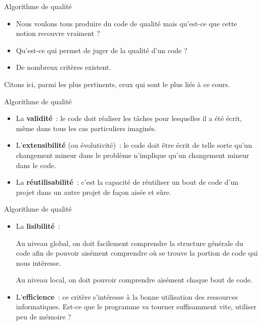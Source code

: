\begin{frame}{Algorithme de qualité}
	\begin{itemize}
	\item
	Nous voulons tous produire du code de qualité mais
	qu'est-ce que cette notion recouvre vraiment ?
	\item
	Qu'est-ce qui permet de juger de la qualité
	d'un code ? 
	\item
	De nombreux critères existent. 
	\end{itemize}
	
	\bigskip
	
	Citons ici,
	parmi les plus pertinents, ceux qui sont le plus liés à ce
	cours.
\end{frame}

\begin{frame}{Algorithme de qualité}
	\begin{itemize}
	\item
		La \textbf{validité}~: le code doit
	réaliser les tâches pour lesquelles 
	il a été écrit, même dans tous les
	cas particuliers imaginés.
	
	\bigskip
	
	\item 
		L'\textbf{extensibilité} (ou évolutivité)~:
	le code doit être écrit de telle sorte qu'un changement
	mineur dans le problème n'implique
	qu'un changement mineur dans le code.
	
	\bigskip
	
	\item
		La \textbf{réutilisabilité}~: c'est
	la capacité de réutiliser 
	un bout de code d’un projet dans un autre projet de 
	façon aisée et sûre.
	\end{itemize}
\end{frame}

\begin{frame}{Algorithme de qualité}
	\begin{itemize}
	\item
		La \textbf{lisibilité}~: 
		
	Au niveau global, on doit facilement comprendre la structure
	générale du code afin de pouvoir aisément comprendre où se trouve 
	la portion de	code qui nous intéresse. 
	
	Au niveau local, on doit pouvoir comprendre
	aisément chaque bout de code.
	
	\bigskip
	
	\item 
		L'\textbf{efficience}~: 
	ce critère s'intéresse à la bonne utilisation des
	ressources informatiques. Est-ce que le programme va tourner
	suffisamment vite, utiliser peu de mémoire ?
	\end{itemize}
\end{frame}
